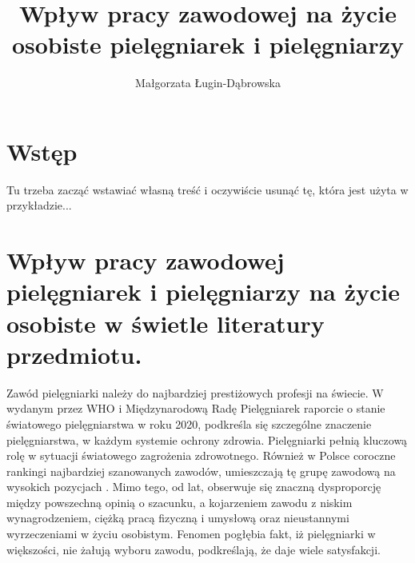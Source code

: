 \documentclass[a4paper,12pt,twoside,openany]{report}
\title{Wpływ pracy zawodowej na życie osobiste pielęgniarek i pielęgniarzy}
\author{Małgorzata Ługin-Dąbrowska}
\begin{document}
\maketitle

\chapter{Wstęp}
Tu trzeba zacząć wstawiać własną treść i oczywiście usunąć tę, która jest użyta w przykładzie...



\chapter{Wpływ pracy zawodowej pielęgniarek i pielęgniarzy na życie osobiste w świetle literatury przedmiotu.}
Zawód pielęgniarki należy do najbardziej prestiżowych profesji na świecie. W wydanym przez WHO i Międzynarodową Radę Pielęgniarek raporcie o stanie światowego pielęgniarstwa w roku 2020, podkreśla się szczególne znaczenie pielęgniarstwa, w każdym systemie ochrony zdrowia. Pielęgniarki pełnią kluczową rolę w sytuacji światowego zagrożenia zdrowotnego.\cite{who} Również w Polsce coroczne rankingi najbardziej szanowanych zawodów, umieszczają tę grupę zawodową na wysokich pozycjach \cite{rap}. Mimo tego, od lat, obserwuje się znaczną dysproporcję między powszechną opinią o szacunku, a kojarzeniem zawodu z niskim wynagrodzeniem, ciężką pracą fizyczną i umysłową oraz nieustannymi wyrzeczeniami w życiu osobistym. Fenomen pogłębia fakt, iż pielęgniarki w większości, nie żałują wyboru zawodu, podkreślają, że daje wiele satysfakcji.

\end{document}
